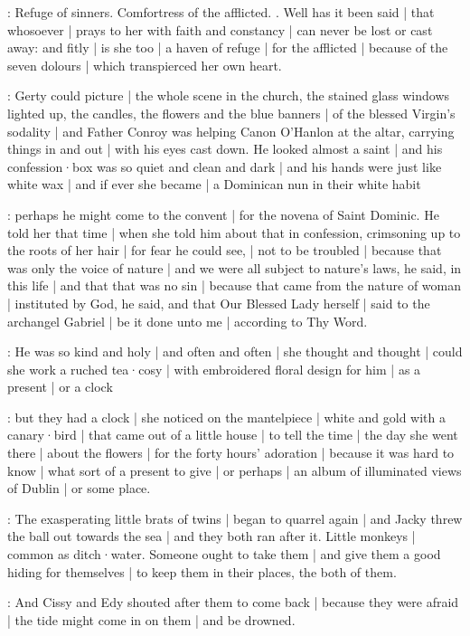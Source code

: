 \Nrelig:
Refuge of sinners.
Comfortress of the afflicted.
.
Well has it been said |
that whosoever |
prays to her with faith and constancy |
can never be lost or cast away:
and fitly |
is she too |
a haven of refuge |
for the afflicted |
because of the seven dolours |
which transpierced her own heart.

\gertyReal:
Gerty could picture |
the whole scene in the church,
the stained glass windows lighted up,
the candles,
the flowers
and the blue banners |
of the blessed Virgin's sodality |
and Father Conroy
was helping Canon O'Hanlon at the altar,
carrying things in and out |
with his eyes cast down.
He looked almost a saint |%
and his confession·box
was so quiet and clean and dark |
and his hands were just like white wax |
and if ever she became |
a Dominican nun in their white habit

\gertySex:
perhaps he might come to the convent |
for the novena of Saint Dominic.
He told her that time |
when she told him about that in confession,
crimsoning up to the roots of her hair |
for fear he could see, |
not to be troubled |
because that was only the voice of nature |
and we were all subject to nature's laws,
he said,
in this life |
and that that was no sin |
because that came from the nature of woman |
instituted by God,
he said,
and that Our Blessed Lady herself |
said to the archangel Gabriel |
be it done unto me |
according to Thy Word.

\gertyRomantic:
He was so kind and holy |
and often and often |
she thought and thought |%
could she work a ruched tea·cosy |
with embroidered floral design for him |
as a present |
or a clock

\gertyReal:
but they had a clock |
she noticed on the mantelpiece |
white and gold with a canary·bird |
that came out of a little house |
to tell the time |
the day she went there |
about the flowers |
for the forty hours' adoration |
because it was hard to know |
what sort of a present to give |
or perhaps |
an album of illuminated views of Dublin |
or some place.

\gertyJudgy:
The exasperating little brats of twins |
began to quarrel again |
and Jacky threw the ball out towards the sea |
and they both ran after it.
Little monkeys |
common as ditch·water.
Someone ought to take them |
and give them a good hiding for themselves |
to keep them in their places,
the both of them.%

:
And Cissy and Edy shouted after them to come back |
because they were afraid |
the tide might come in on them |
and be drowned.

